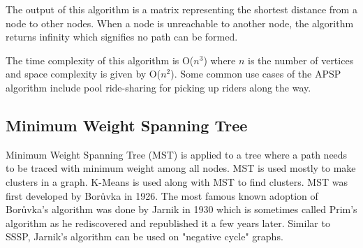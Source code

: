 \documentclass[journal,twoside,web]{ieeecolor}
\begin{document}
The output of this algorithm is a matrix representing the shortest distance from a node to other nodes. When a node is unreachable to another node, the algorithm returns infinity which signifies no path can be formed.

The time complexity of this algorithm is O($n^3$) where $n$ is the number of vertices and space complexity is given by O($n^2$). Some common use cases of the APSP algorithm include pool ride-sharing for picking up riders along the way.

\subsection{Minimum Weight Spanning Tree}
Minimum Weight Spanning Tree (MST) is applied to a tree where a path needs to be traced with minimum weight among all nodes. MST is used mostly to make clusters in a graph. K-Means is used along with MST to find clusters. MST was first developed by Borůvka in 1926\cite{47}. The most famous known adoption of Borůvka's algorithm was done by Jarnik in 1930\cite{48} which is sometimes called Prim's algorithm as he rediscovered and republished it a few years later\cite{49}. Similar to SSSP, Jarnik's algorithm can be used on "negative cycle" graphs.
\end{document}
